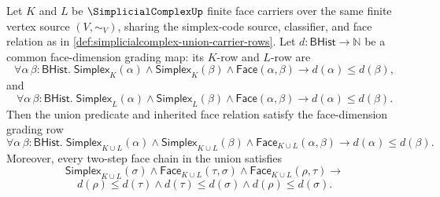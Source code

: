 \begin{theorem}
\label{thm:simplicialcomplex-union-inherits-face-dimension-grading}
Let $K$ and $L$ be $\SimplicialComplexUp$ finite face carriers over the same finite vertex source $(V,\sim_V)$, sharing the simplex-code source, classifier, and face relation as in \autoref{def:simplicialcomplex-union-carrier-rows}. Let $d:\mathsf{BHist}\to\mathbb{N}$ be a common face-dimension grading map: its $K$-row and $L$-row are
$$
\forall \alpha\,\beta:\mathsf{BHist}.\;
\mathsf{Simplex}_K(\alpha)\land
\mathsf{Simplex}_K(\beta)\land
\mathsf{Face}(\alpha,\beta)
\to
d(\alpha)\le d(\beta),
$$
and
$$
\forall \alpha\,\beta:\mathsf{BHist}.\;
\mathsf{Simplex}_L(\alpha)\land
\mathsf{Simplex}_L(\beta)\land
\mathsf{Face}(\alpha,\beta)
\to
d(\alpha)\le d(\beta).
$$
Then the union predicate and inherited face relation satisfy the face-dimension grading row
$$
\forall \alpha\,\beta:\mathsf{BHist}.\;
\mathsf{Simplex}_{K\cup L}(\alpha)\land
\mathsf{Simplex}_{K\cup L}(\beta)\land
\mathsf{Face}_{K\cup L}(\alpha,\beta)
\to
d(\alpha)\le d(\beta).
$$
Moreover, every two-step face chain in the union satisfies
$$
\mathsf{Simplex}_{K\cup L}(\sigma)
\land
\mathsf{Face}_{K\cup L}(\tau,\sigma)
\land
\mathsf{Face}_{K\cup L}(\rho,\tau)
\to
$$
$$
d(\rho)\le d(\tau)
\land
d(\tau)\le d(\sigma)
\land
d(\rho)\le d(\sigma).
$$
\end{theorem}

